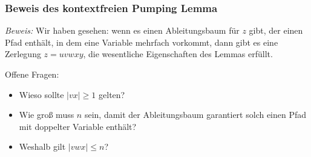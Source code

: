 \documentclass[onlymath]{beamer}
\begin{document}
\begin{frame}[t]\frametitle{Beweis des kontextfreien Pumping Lemma}

\vspace{-1ex}
\medskip

\emph{Beweis:} Wir haben gesehen: wenn es einen Ableitungsbaum für $z$ gibt, der einen Pfad
enthält, in dem eine Variable  mehrfach vorkommt, dann gibt es eine Zerlegung
$z=uvwxy$, die wesentliche Eigenschaften des Lemmas erfüllt.
\medskip\pause

Offene Fragen:
\begin{itemize}
\item Wieso sollte $|vx|\geq 1$ gelten?
\item Wie groß muss $n$ sein, damit der Ableitungsbaum garantiert solch einen Pfad mit doppelter Variable enthält?
\item Weshalb gilt $|vwx|\leq n$?
\end{itemize}\pause


\end{frame}
\end{document}
